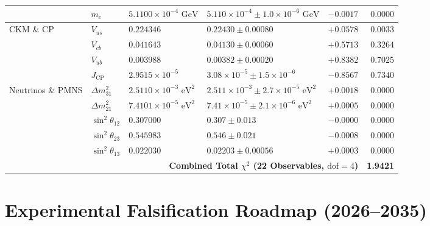 \documentclass[11pt, a4paper]{article}
\begin{document}
{\begin{longtable}{p{2.6cm} l l p{4.1cm} r r}
 & $m_e$ & $5.1100 \times 10^{-4}\text{ GeV}$ & $5.110 \times 10^{-4} \pm 1.0 \times 10^{-6}\text{ GeV}$ & $-0.0017$ & $0.0000$ \\
\midrule
CKM \& CP & $V_{us}$ & $0.224346$ & $0.22430 \pm 0.00080$ & $+0.0578$ & $0.0033$ \\
 & $V_{cb}$ & $0.041643$ & $0.04130 \pm 0.00060$ & $+0.5713$ & $0.3264$ \\
 & $V_{ub}$ & $0.003988$ & $0.00382 \pm 0.00020$ & $+0.8382$ & $0.7025$ \\
 & $J_{\text{CP}}$ & $2.9515 \times 10^{-5}$ & $3.08 \times 10^{-5} \pm 1.5 \times 10^{-6}$ & $-0.8567$ & $0.7340$ \\
\midrule
Neutrinos \& PMNS & $\Delta m_{31}^2$ & $2.5110 \times 10^{-3}\text{ eV}^2$ & $2.511 \times 10^{-3} \pm 2.7 \times 10^{-5}\text{ eV}^2$ & $+0.0018$ & $0.0000$ \\
 & $\Delta m_{21}^2$ & $7.4101 \times 10^{-5}\text{ eV}^2$ & $7.41 \times 10^{-5} \pm 2.1 \times 10^{-6}\text{ eV}^2$ & $+0.0005$ & $0.0000$ \\
 & $\sin^2\theta_{12}$ & $0.307000$ & $0.307 \pm 0.013$ & $-0.0000$ & $0.0000$ \\
 & $\sin^2\theta_{23}$ & $0.545983$ & $0.546 \pm 0.021$ & $-0.0008$ & $0.0000$ \\
 & $\sin^2\theta_{13}$ & $0.022030$ & $0.02203 \pm 0.00056$ & $+0.0003$ & $0.0000$ \\
\midrule
\multicolumn{5}{r}{\textbf{Combined Total $\chi^2$ (22 Observables, $\text{dof} = 4$)}} & \textbf{1.9421} \\
\end{longtable}
}


\section{Experimental Falsification Roadmap (2026--2035)}
\end{document}
